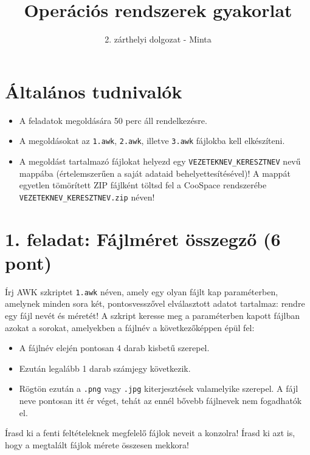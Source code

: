 \documentclass[a4paper,12pt]{article}
\begin{document}
\title{\vspace{-22mm}Operációs rendszerek gyakorlat}
\author{}
\date{\vspace{-2mm}2. zárthelyi dolgozat - Minta}

\maketitle

\section*{Általános tudnivalók}
\begin{itemize}
    \item A feladatok megoldására 50 perc áll rendelkezésre.
    \item A megoldásokat az \texttt{1.awk}, \texttt{2.awk}, illetve \texttt{3.awk} fájlokba kell elkészíteni.
    \item A megoldást tartalmazó fájlokat helyezd egy \texttt{VEZETEKNEV\_KERESZTNEV} nevű mappába (értelemszerűen a saját adataid behelyettesítésével)! A mappát egyetlen tömörített ZIP fájlként töltsd fel a CooSpace rendszerébe \texttt{VEZETEKNEV\_KERESZTNEV.zip} néven!
\end{itemize}

\section*{1. feladat: Fájlméret összegző (6 pont)}
Írj AWK szkriptet \texttt{1.awk} néven, amely egy olyan fájlt kap paraméterben, amelynek minden sora két, pontosvesszővel elválasztott adatot tartalmaz: rendre egy fájl nevét és méretét! A szkript keresse meg a paraméterben kapott fájlban azokat a sorokat, amelyekben a fájlnév a következőképpen épül fel:
\begin{itemize}
    \item A fájlnév elején pontosan 4 darab kisbetű szerepel.
    \item Ezután legalább 1 darab számjegy következik.
    \item Rögtön ezután a \texttt{.png} vagy \texttt{.jpg} kiterjesztések valamelyike szerepel. A fájl neve pontosan itt ér véget, tehát az ennél bővebb fájlnevek nem fogadhatók el.
\end{itemize}

Írasd ki a fenti feltételeknek megfelelő fájlok neveit a konzolra! Írasd ki azt is, hogy a megtalált fájlok mérete összesen mekkora!
\end{document}

